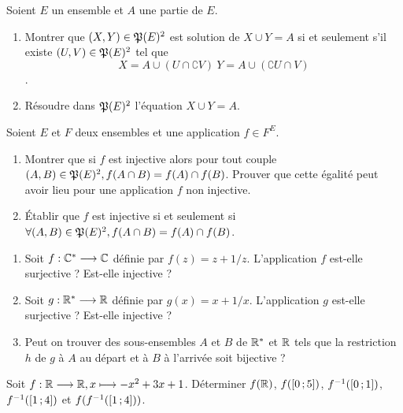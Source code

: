 \begin{exercice}[Résolution dans \(\Part(E)\) des équations \(X \cup Y=A\) et 
    \(X \cap Y=A\)]
    Soient \(E\) un ensemble et \(A\) une partie de \(E\).
    \begin{enumerate}
        \item Montrer que \((X,Y)\in\mathfrak{P}(E)^2\) est solution de \(X \cup Y=A\) 
            si et seulement s'il existe \((U, V) \in \mathfrak{P}(E)^2\) tel que 
            \[X=A\cup(U\cap \complement V) \ Y=A\cup(\complement U \cap V)\].
        \item Résoudre dans \(\mathfrak{P}(E)^2\) l'équation \(X \cup Y = A\).
    \end{enumerate}
\end{exercice}

\begin{exercice}
    Soient \(E\) et \(F\) deux ensembles et une application \(f \in F^E\).
    \begin{enumerate}
        \item Montrer que si \(f\) est injective alors pour tout couple \((A,B) 
            \in \mathfrak{P}(E)^2, f(A\cap B) = f(A) \cap f(B)\). Prouver que cette 
            égalité peut avoir lieu pour une application \(f\) non injective.
        \item Établir que \(f\) est injective si et seulement si \(\forall (A,B) 
            \in \mathfrak{P}(E)^2, f(A\cap B) = f(A) \cap f(B)\).
    \end{enumerate}
\end{exercice}
\begin{exercice}
    \begin{enumerate}
        \item Soit \(f : \mathbb{C}^* \longrightarrow \mathbb{C}\) définie par \(f(z)=z+1/z\). L'application \(f\) est-elle surjective ? Est-elle injective ?
        \item Soit \(g : \mathbb{R}^* \longrightarrow \mathbb{R}\) définie par \(g(x)=x+1/x\). L'application \(g\) est-elle surjective ? Est-elle injective ?
        \item Peut on trouver des sous-ensembles \(A\) et \(B\) de \(\mathbb{R}^*\) et \(\mathbb{R}\) tels que la restriction \(h\) de \(g\) à \(A\) au départ et à \(B\) à l'arrivée soit bijective ?
    \end{enumerate}
\end{exercice}
\begin{exercice}
    Soit \(f:\mathbb{R} \longrightarrow \mathbb{R}, x \longmapsto -x^2+3x+1\). Déterminer \(f(\mathbb{R})\), \(f(\left[ 0 \, ;  5 \right])\), \(f^{-1}(\left[ 0 \, ;  1 \right])\), \(f^{-1}(\left[ 1 \, ;  4 \right])\) et \(f(f^{-1}(\left[ 1 \, ;  4 \right]))\).
\end{exercice}
